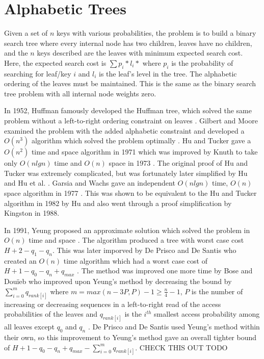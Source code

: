 \documentclass[letterpaper,12pt,titlepage,oneside,final]{book}
\theoremstyle{plain}
\begin{document}
 
\section{Alphabetic Trees}

Given a set of $n$ keys with various probabilities, the problem is to build a binary search tree where every internal node has two children, leaves have no children, and the $n$ keys described are the leaves with minimum expected search cost. Here, the expected search cost is $\sum p_i * l_i*$ where $p_i$ is the probability of searching for leaf/key $i$ and $l_i$ is the leaf's level in the tree. The alphabetic ordering of the leaves must be maintained. This is the same as the binary search tree problem with all internal node weights zero.

In 1952, Huffman famously developed the Huffman tree, which solved the same problem without a left-to-right ordering constraint on leaves \cite{huffman1952method}. Gilbert and Moore examined the problem with the added alphabetic constraint and developed a $O(n^3)$ algorithm which solved the problem optimally \cite{gilbert1959variable}. Hu and Tucker gave a $O(n^2)$ time and space algorithm in 1971 \cite{hu1971optimal} which was improved by Knuth to take only $O(n lg n)$ time and $O(n)$ space in 1973 \cite{knuth1973sorting}. The original proof of Hu and Tucker was extremely complicated, but was fortunately later simplified by Hu \cite{hu1973new} and Hu et al. \cite{hu1979binary}. Garsia and Wachs gave an independent $O(n lg n)$ time, $O(n)$ space algorithm in 1977 \cite{garsia1977new}. This was shown to be equivalent to the Hu and Tucker algorithm in 1982 by Hu \cite{Hu1982Book} and also went through a proof simplification \cite{kingston1988new} by Kingston in 1988.

In 1991, Yeung proposed an approximate solution which solved the problem in $O(n)$ time and space \cite{yeung1991alphabetic}. The algorithm produced a tree with worst case cost $H + 2 - q_1-q_n$. This was later imporved by De Prisco and De Santis who created an $O(n)$ time algorithm which had a worst case cost of $H+1-q_0-q_n+q_{max}$ \cite{de1993binary}. The method was improved one more time by Bose and Dou\"{i}eb who improved upon Yeung's method by decreasing the bound by $\sum_{i=0}^m q_{rank[i]}$ where $m=max({n-3P,P})-1 \geq \frac{n}{4} - 1$, $P$ is the number of increasing or decreasing sequences in a left-to-right read of the access probabilities of the leaves and $q_{rank[i]}$ is the $i^{th}$ smallest access probability among all leaves except $q_0$ and $q_n$ \cite{bose2009efficient}. De Prisco and De Santis used Yeung's method within their own, so this improvement to Yeung's method gave an overall tighter bound of $H+1-q_0-q_n+q_{max}-\sum_{i=0}^m q_{rank[i]}$. CHECK THIS OUT TODO
\end{document}
